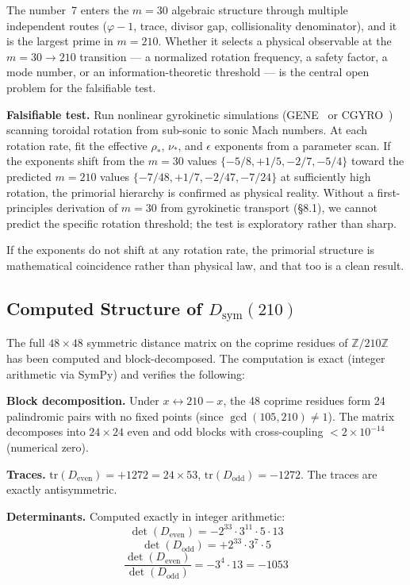 \documentclass[11pt,letterpaper]{article}
\theoremstyle{definition}
\begin{document}
The number~7 enters the $m = 30$ algebraic structure through multiple independent routes ($\varphi - 1$, trace, divisor gap, collisionality denominator), and it is the largest prime in $m = 210$. Whether it selects a physical observable at the $m = 30 \to 210$ transition --- a normalized rotation frequency, a safety factor, a mode number, or an information-theoretic threshold --- is the central open problem for the falsifiable test.

\medskip
\textbf{Falsifiable test.} Run nonlinear gyrokinetic simulations (GENE~\cite{jenko2000} or CGYRO~\cite{candy2016}) scanning toroidal rotation from sub-sonic to sonic Mach numbers. At each rotation rate, fit the effective $\rho_*$, $\nu_*$, and $\epsilon$ exponents from a parameter scan. If the exponents shift from the $m = 30$ values $\{-5/8, +1/5, -2/7, -5/4\}$ toward the predicted $m = 210$ values $\{-7/48, +1/7, -2/47, -7/24\}$ at sufficiently high rotation, the primorial hierarchy is confirmed as physical reality. Without a first-principles derivation of $m = 30$ from gyrokinetic transport (\S8.1), we cannot predict the specific rotation threshold; the test is exploratory rather than sharp.

If the exponents do not shift at any rotation rate, the primorial structure is mathematical coincidence rather than physical law, and that too is a clean result.

\subsection{Computed Structure of $D_{\text{sym}}(210)$}

The full $48 \times 48$ symmetric distance matrix on the coprime residues of $\mathbb{Z}/210\mathbb{Z}$ has been computed and block-decomposed. The computation is exact (integer arithmetic via SymPy) and verifies the following:

\medskip
\textbf{Block decomposition.} Under $x \leftrightarrow 210 - x$, the 48 coprime residues form 24 palindromic pairs with no fixed points (since $\gcd(105, 210) \neq 1$). The matrix decomposes into $24 \times 24$ even and odd blocks with cross-coupling $< 2 \times 10^{-14}$ (numerical zero).

\textbf{Traces.} $\text{tr}(D_{\text{even}}) = +1272 = 24 \times 53$, $\text{tr}(D_{\text{odd}}) = -1272$. The traces are exactly antisymmetric.

\textbf{Determinants.} Computed exactly in integer arithmetic:
\[
\det(D_{\text{even}}) = -2^{33} \cdot 3^{11} \cdot 5 \cdot 13
\]
\[
\det(D_{\text{odd}}) = +2^{33} \cdot 3^{7} \cdot 5
\]
\[
\frac{\det(D_{\text{even}})}{\det(D_{\text{odd}})} = -3^4 \cdot 13 = -1053
\]
\end{document}
